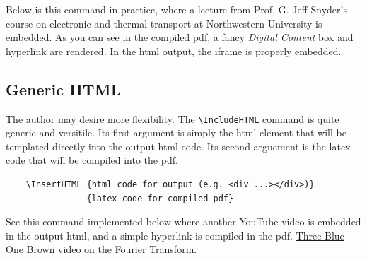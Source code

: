 \documentclass{article}
\begin{document}
Below is this command in practice, where a lecture from Prof. G. Jeff Snyder's course on electronic and thermal transport at Northwestern University is embedded. As you can see in the compiled pdf, a fancy \textit{Digital Content} box and hyperlink are rendered. In the html output, the iframe is properly embedded.


\subsection{Generic HTML}
The author may desire more flexibility. The \verb'\IncludeHTML' command is quite generic and versitile. Its first argument is simply the html element that will be templated directly into the output html code. Its second arguement is the latex code that will be compiled into the pdf.   
\begin{verbatim}
    \InsertHTML {html code for output (e.g. <div ...></div>)}
                {latex code for compiled pdf}
\end{verbatim}  

See this command implemented below where another YouTube video is embedded in the output html, and a simple hyperlink is compiled in the pdf. 
           {\href{https://www.youtube.com/embed/spUNpyF58BY?si=wW31fiDuXUkdEAQn}{Three Blue One Brown video on the Fourier Transform.}}




\end{document}
